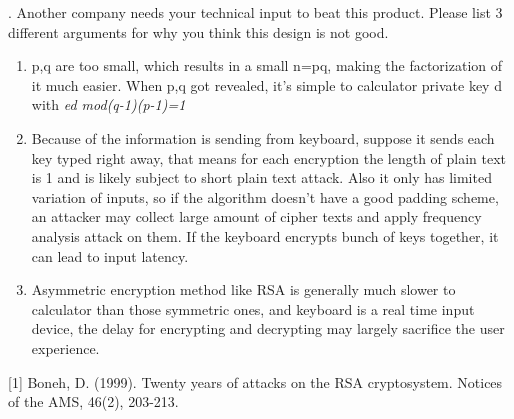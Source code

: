 \documentclass[12pt]{article}  %
\begin{document}
. Another company needs your technical input to beat this product. Please list 3 different arguments for why you think this design is not good.
\begin{enumerate}
  \setlength{\itemsep}{1pt}
  \setlength{\parskip}{0pt}
  \setlength{\parsep}{0pt}
\item p,q are too small, which results in a small n=pq, making the factorization of it much easier. When p,q got revealed, it's simple to calculator private key d with {\it ed mod(q-1)(p-1)=1}
\item Because of the information is sending from keyboard, suppose it sends each key typed right away, that means for each encryption the length of plain text is 1 and is likely subject to short plain text attack. Also it only has limited variation of inputs, so if the algorithm doesn't have a good padding scheme, an attacker may collect large amount of cipher texts and apply frequency analysis attack on them. If the keyboard encrypts bunch of keys together, it can lead to input latency.
\item Asymmetric encryption method like RSA is generally much slower to calculator than those symmetric ones, and keyboard is a real time input device, the delay for encrypting and decrypting may largely sacrifice the user experience.
\end{enumerate}

[1] Boneh, D. (1999). Twenty years of attacks on the RSA cryptosystem. Notices of the AMS, 46(2), 203-213.
\end{document}
